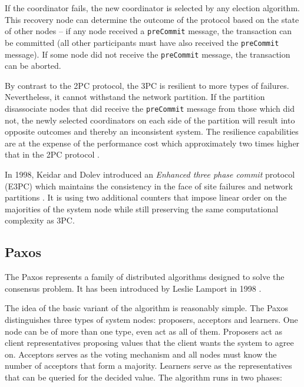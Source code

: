 \documentclass[oneside,
  digital, %
  table,   %
  nolof,     %
  nolot,     %
]{fithesis3}
\begin{document}
If the coordinator fails, the new coordinator is selected by any election algorithm. This recovery node can determine the outcome of the protocol based on the state of other nodes -- if any node received a \texttt{preCommit} message, the transaction can be committed (all other participants must have also received the \texttt{preCommit} message). If some node did not receive the \texttt{preCommit} message, the transaction can be aborted.

By contrast to the 2PC protocol, the 3PC is resilient to more types of failures. Nevertheless, it cannot withstand the network partition. If the partition disassociate nodes that did receive the \texttt{preCommit} message from those which did not, the newly selected coordinators on each side of the partition will result into opposite outcomes and thereby an inconsistent system. The resilience capabilities are at the expense of the performance cost which approximately two times higher that in the 2PC protocol \cite{3PC}.

In 1998, Keidar and Dolev introduced an \textit{Enhanced three phase commit} protocol (E3PC) which maintains the consistency in the face of site failures and network partitions \cite{E3PC}. It is using two additional counters that impose linear order on the majorities of the system node while still preserving the same computational complexity as 3PC. 


\subsection{Paxos}

The Paxos represents a family of distributed algorithms designed to solve the consensus problem. It has been introduced by Leslie Lamport in 1998 \cite{Paxos}.

The idea of the basic variant of the algorithm is reasonably simple. The Paxos distinguishes three types of system nodes: proposers, acceptors and learners. One node can be of more than one type, even act as all of them. Proposers act as client representatives proposing values that the client wants the system to agree on. Acceptors serves as the voting mechanism and all nodes must know the number of acceptors that form a majority. Learners serve as the representatives that can be queried for the decided value. The algorithm runs in two phases:
\end{document}
